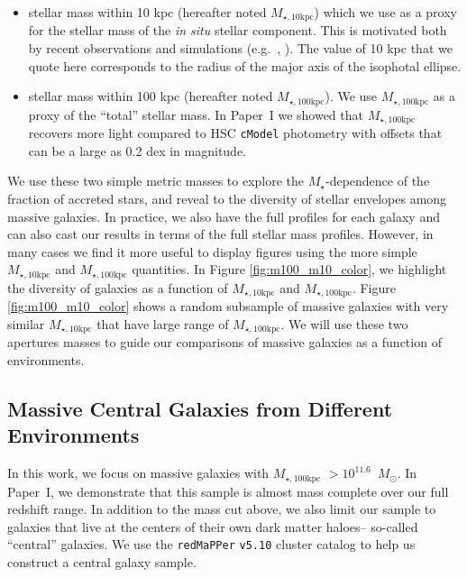 \documentclass[a4paper,fleqn,usenatbib]{mnras}
\def\msun{$M_\odot$}
\def\redm{\texttt{redMaPPer}}
\def\cmodel{\texttt{cModel}}
\def\mstar{{$M_{\star}$}}
\def\minn{{$M_{\star,10\mathrm{kpc}}$}}
\def\mtot{{$M_{\star,100\mathrm{kpc}}$}}
\begin{document}
    \begin{itemize}
    
        \item stellar mass within 10 kpc (hereafter noted \minn{}) which we use 
            as a proxy for the stellar mass of the \textit{in situ} stellar 
            component. 
            This is motivated both by recent observations and simulations 
            (e.g.~\citealt{vanDokkum2010}, \citealt{RodriguezGomez2016}). 
            The value of 10 kpc that we quote here corresponds to the radius of the 
            major axis of the isophotal ellipse.
            
        \item stellar mass within 100 kpc (hereafter noted \mtot{}). 
            We use \mtot{} as a proxy of the ``total'' stellar mass. 
            In Paper~I we showed that \mtot{} recovers more light compared to 
            HSC \cmodel{} photometry with offsets that can be a large as 0.2 dex 
            in magnitude.        
               
   \end{itemize}
   
   We use these two simple metric masses to explore the \mstar{}-dependence of the 
   fraction of accreted stars, and reveal to the diversity of stellar envelopes among 
   massive galaxies. 
   In practice, we also have the full profiles for each galaxy and can also cast our 
   results in terms of the full stellar mass profiles. 
   However, in many cases we find it more useful to display figures using the more 
   simple \minn{} and \mtot{} quantities. 
   In Figure \ref{fig:m100_m10_color}, we highlight the diversity of galaxies as a 
   function of \minn{} and \mtot{}. 
   Figure \ref{fig:m100_m10_color} shows a random subsample of massive galaxies with 
   very similar \minn{} that have large range of \mtot{}. 
   We will use these two apertures masses to guide our comparisons of massive galaxies 
   as a function of environments.  
    
\subsection{Massive Central Galaxies from Different Environments}
    \label{ssec:cen}
         
    In this work, we focus on massive galaxies with \mtot{} $>10^{11.6}$~\msun{}. 
    In Paper~I, we demonstrate that this sample is almost mass complete over our full 
    redshift range. 
    In addition to the mass cut above, we also limit our sample to galaxies that live 
    at the centers of their own dark matter haloes-- so-called ``central'' galaxies. 
    We use the \redm{} \texttt{v5.10} \citep{Rykoff2014, Rozo2015b} cluster catalog 
    to help us construct a central galaxy sample.
    
\end{document}
